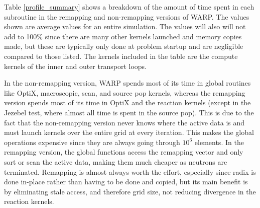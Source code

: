 Table \ref{profile_summary} shows a breakdown of the amount of time spent in each subroutine in the remapping and non-remapping versions of WARP.  The values shown are average values for an entire simulation.  The values will also will not add to 100\% since there are many other kernels launched and memory copies made, but these are typically only done at problem startup and are negligible compared to those listed.  The kernels included in the table are the compute kernels of the inner and outer transport loops.  

In the non-remapping version, WARP spends most of its time in global routines like OptiX, macroscopic, scan, and source pop kernels, whereas the remapping version spends most of its time in OptiX and the reaction kernels (except in the Jezebel test, where almost all time is spent in the source pop).  This is due to the fact that the non-remapping version never knows where the active data is and must launch kernels over the entire grid at every iteration.  This makes the global operations expensive since they are always going through $10^6$ elements.  In the remapping version, the global functions access the remapping vector and only sort or scan the active data, making them much cheaper as neutrons are terminated.  Remapping is almost always worth the effort, especially since radix is done in-place rather than having to be done and copied, but its main benefit is by eliminating stale access, and therefore grid size, not reducing divergence in the reaction kernels.%




